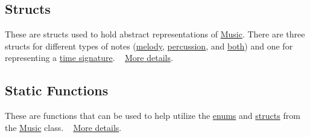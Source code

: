 \begin{DoxyParagraph}{}

\end{DoxyParagraph}
\hypertarget{group___music_group_DocMusicStructs}{}\subsection{Structs}\label{group___music_group_DocMusicStructs}
These are structs used to hold abstract representations of \hyperlink{class_music}{Music}. There are three structs for different types of notes (\hyperlink{group___music_structs_struct_music_1_1_melody_note}{melody}, \hyperlink{group___music_structs_struct_music_1_1_percussion_note}{percussion}, and \hyperlink{group___music_structs_struct_music_1_1_combined_note}{both}) and one for representing a \hyperlink{group___music_structs_struct_music_1_1_time_signature}{time signature}. ~\newline
 \hyperlink{group___music_structs}{More details}.

\begin{DoxyParagraph}{}

\end{DoxyParagraph}
\hypertarget{group___music_group_DocMusicStatFunc}{}\subsection{Static Functions}\label{group___music_group_DocMusicStatFunc}
These are functions that can be used to help utilize the \hyperlink{group___music_enums}{enums} and \hyperlink{group___music_structs}{structs} from the \hyperlink{class_music}{Music} class. ~\newline
 \hyperlink{group___music_stat_func}{More details}. 